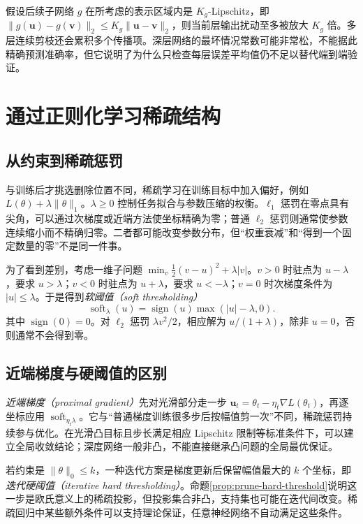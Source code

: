 \documentclass[UTF8,12pt,a4paper,fontset=fandol]{ctexart}
\begin{document}
假设后续子网络 $g$ 在所考虑的表示区域内是 $K_g$-Lipschitz，即 $\|g(\mathbf u)-g(\mathbf v)\|_2\leq K_g\|\mathbf u-\mathbf v\|_2$，则当前层输出扰动至多被放大 $K_g$ 倍。多层连续剪枝还会累积多个传播项。深层网络的最坏情况常数可能非常松，不能据此精确预测准确率，但它说明了为什么只检查每层误差平均值仍不足以替代端到端验证。

\section{通过正则化学习稀疏结构}
\label{sec:prune-regularization}

\subsection{从约束到稀疏惩罚}
与训练后才挑选删除位置不同，稀疏学习在训练目标中加入偏好，例如 $L(\theta)+\lambda\|\theta\|_1$。$\lambda\geq0$ 控制任务拟合与参数压缩的权衡。$\ell_1$ 惩罚在零点具有尖角，可以通过次梯度或近端方法使坐标精确为零；普通 $\ell_2$ 惩罚则通常使参数连续缩小而不精确归零。二者都可能改变参数分布，但“权重衰减”和“得到一个固定数量的零”不是同一件事。

为了看到差别，考虑一维子问题 $\min_v\tfrac12(v-u)^2+\lambda|v|$。$v>0$ 时驻点为 $u-\lambda$，要求 $u>\lambda$；$v<0$ 时驻点为 $u+\lambda$，要求 $u<-\lambda$；$v=0$ 时次梯度条件为 $|u|\leq\lambda$。于是得到\emph{软阈值（soft thresholding）}
\begin{equation}
 \operatorname{soft}_{\lambda}(u)
 =\operatorname{sign}(u)\max(|u|-\lambda,0).
 \label{eq:prune-soft}
\end{equation}
其中 $\operatorname{sign}(0)=0$。对 $\ell_2$ 惩罚 $\lambda v^2/2$，相应解为 $u/(1+\lambda)$，除非 $u=0$，否则通常不会得到零。

\subsection{近端梯度与硬阈值的区别}
\emph{近端梯度（proximal gradient）}先对光滑部分走一步 $\mathbf u_t=\theta_t-\eta_t\nabla L(\theta_t)$，再逐坐标应用 $\operatorname{soft}_{\eta_t\lambda}$。它与“普通梯度训练很多步后按幅值剪一次”不同，稀疏惩罚持续参与优化。在光滑凸目标且步长满足相应 Lipschitz 限制等标准条件下，可以建立全局收敛结论；深度网络一般非凸，不能直接继承凸问题的全局最优保证。

若约束是 $\|\theta\|_0\leq k$，一种迭代方案是梯度更新后保留幅值最大的 $k$ 个坐标，即\emph{迭代硬阈值（iterative hard thresholding）}。命题\ref{prop:prune-hard-threshold}说明这一步是欧氏意义上的稀疏投影，但投影集合非凸，支持集也可能在迭代间改变。稀疏回归中某些额外条件可以支持理论保证，任意神经网络不自动满足这些条件。
\end{document}
